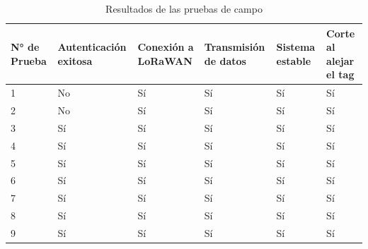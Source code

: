 \begin{table}[H]
\centering
\renewcommand{\arraystretch}{1.3} %
\caption{Resultados de las pruebas de campo}
\label{tab:resultable}
\begin{tabular}{|p{1.2cm}|p{2.65cm}|p{2cm}|p{2.4cm}|p{1.6cm}|p{1.7cm}|}
\hline
\textbf{N° de Prueba} & \textbf{Autenticación exitosa} & \textbf{Conexión a LoRaWAN} & \textbf{Transmisión de datos} & \textbf{Sistema estable} & \textbf{Corte al alejar el tag} \\ \hline
1                     & No                             & Sí                          & Sí                            & Sí                      & Sí                              \\ \hline
2                     & No                             & Sí                          & Sí                            & Sí                      & Sí                              \\ \hline
3                     & Sí                             & Sí                          & Sí                            & Sí                      & Sí                              \\ \hline
4                     & Sí                             & Sí                          & Sí                            & Sí                      & Sí                              \\ \hline
5                     & Sí                             & Sí                          & Sí                            & Sí                      & Sí                              \\ \hline
6                     & Sí                             & Sí                          & Sí                            & Sí                      & Sí                              \\ \hline
7                     & Sí                             & Sí                          & Sí                            & Sí                      & Sí                              \\ \hline
8                     & Sí                             & Sí                          & Sí                            & Sí                      & Sí                              \\ \hline
9                     & Sí                             & Sí                          & Sí                            & Sí                      & Sí                              \\ \hline
\end{tabular}
\end{table}


